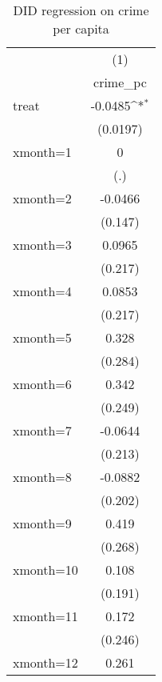 \begin{table}[htbp]\centering
\def\sym#1{\ifmmode^{#1}\else\(^{#1}\)\fi}
\caption{DID regression on crime per capita}
\begin{tabular}{l*{1}{c}}
\hline\hline
                    &\multicolumn{1}{c}{(1)}\\
                    &\multicolumn{1}{c}{crime\_pc}\\
\hline
treat               &     -0.0485\sym{*}  \\
                    &    (0.0197)         \\
[1em]
xmonth=1            &           0         \\
                    &         (.)         \\
[1em]
xmonth=2            &     -0.0466         \\
                    &     (0.147)         \\
[1em]
xmonth=3            &      0.0965         \\
                    &     (0.217)         \\
[1em]
xmonth=4            &      0.0853         \\
                    &     (0.217)         \\
[1em]
xmonth=5            &       0.328         \\
                    &     (0.284)         \\
[1em]
xmonth=6            &       0.342         \\
                    &     (0.249)         \\
[1em]
xmonth=7            &     -0.0644         \\
                    &     (0.213)         \\
[1em]
xmonth=8            &     -0.0882         \\
                    &     (0.202)         \\
[1em]
xmonth=9            &       0.419         \\
                    &     (0.268)         \\
[1em]
xmonth=10           &       0.108         \\
                    &     (0.191)         \\
[1em]
xmonth=11           &       0.172         \\
                    &     (0.246)         \\
[1em]
xmonth=12           &       0.261         \\

\end{tabular}
\end{table}
